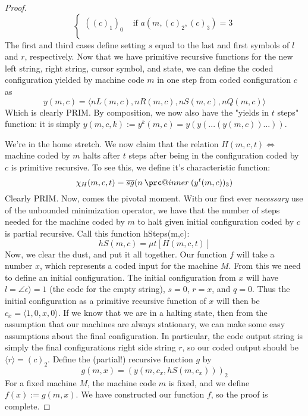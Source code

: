 \documentclass{article}
\makeatletter
\newcommand{\prc}{\mathbin{\mathpalette\prc@inner\relax}}
\newcommand{\prc@inner}[2]{%
  \vbox{\offinterlineskip\m@th
    \ialign{%
      ##\cr
      \hidewidth\raisebox{-1.5\height}[0pt][0pt]{$#1.$}\hidewidth\cr
      $#1-$\cr
    }%
  }%
}
\theoremstyle{definition}
\theoremstyle{plain}
\theoremstyle{theorem}
\makeatother
\begin{document}
\begin{proof}
\[\begin{cases}
                    ((c)_1)_0 & \textrm{ if $a(m,(c)_2,(c)_3) = 3$} \\
                 \end{cases}\]
    The first and third cases define setting $s$ equal to the last and first symbols of $l$ and $r$, respectively. Now that we have primitive recursive functions for the new left string, right string, cursor symbol, and state, we can define the coded configuration yielded by machine code $m$ in one step from coded configuration $c$ as
    \[ y(m,c) = \langle nL(m,c),nR(m,c),nS(m,c),nQ(m,c) \rangle \]
    Which is clearly PRIM. By composition, we now also have the "yields in $t$ steps" function: it is simply $y(m,c,k) := y^k(m,c) = y(y(...(y(m,c))...))$.
    \par We're in the home stretch. We now claim that the relation $H(m,c,t) \iff $ machine coded by $m$ halts after $t$ steps after being in the configuration coded by $c$ is primitive recursive. To see this, we define it's characteristic function:
    \[\chi_H(m,c,t) = \overline{sg}(n \prc (y^t(m,c))_3) \]
    Clearly PRIM. Now, comes the pivotal moment. With our first ever \textit{necessary} use of the unbounded minimization operator, we have that the number of steps needed for the machine coded by $m$ to halt given initial configuration coded by $c$ is partial recursive. Call this function hSteps(m,c):
    \[ hS(m,c) = \mu t [H(m,c,t)] \]
    Now, we clear the dust, and put it all together. Our function $f$ will take a number $x$, which represents a coded input for the machine $M$. From this we need to define an initial configuration. The initial configuration from $x$ will have $l = \angle \epsilon \rangle = 1$ (the code for the empty string), $s = 0$, $r = x$, and $q = 0$. Thus the initial configuration as a primitive recursive function of $x$ will then be $c_x = \langle 1,0,x,0 \rangle$. If we know that we are in a halting state, then from the assumption that our machines are always stationary, we can make some easy assumptions about the final configuration. In particular, the code output string is simply the final configurations right side string $r$, so our coded output should be $\langle r \rangle = (c)_2$. Define the (partial!) recursive function $g$ by
    \[ g(m,x) = (y(m,c_x,hS(m,c_x)))_2 \]
    For a fixed machine $M$, the machine code $m$ is fixed, and we define $f(x) := g(m,x)$. We have constructed our function $f$, so the proof is complete.
\end{proof}
\end{document}
